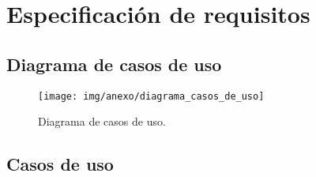 \section{Especificación de requisitos}

\subsection{Diagrama de casos de uso}

	\begin{figure}[!h]
		\centering
		\texttt{[image: img/anexo/diagrama\_casos\_de\_uso]}
		\caption{Diagrama de casos de uso.}\label{fig:img/anexo/diagrama_casos_de_uso}
	\end{figure}


 
\subsection{Casos de uso}
 

